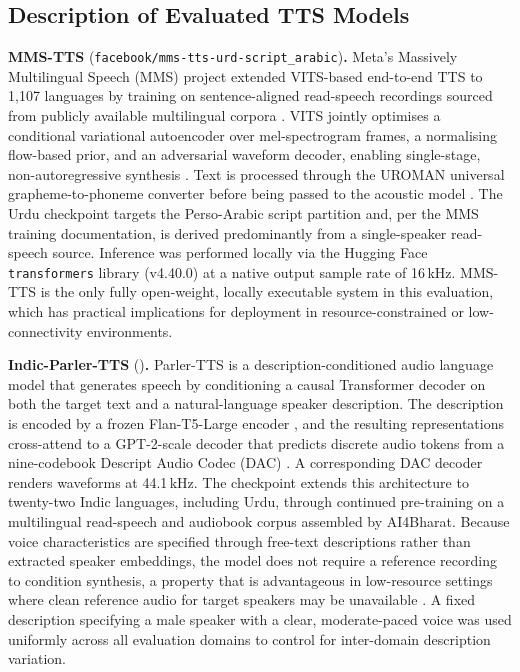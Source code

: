 \documentclass[a4paper,fleqn]{cas-dc}
\begin{document}
    \subsection{Description of Evaluated TTS Models}\label{sec:systems-desc}
    
    \begin{sloppypar}
    \indent\textbf{MMS-TTS} (\texttt{facebook/\-mms-\-tts-\-urd-\-script\_arabic})\textbf{.}
    Meta's Massively Multilingual Speech (MMS) project extended VITS-based
    end-to-end TTS \citep{kim2021vits} to 1{,}107 languages by training on
    sentence-aligned read-speech recordings sourced from publicly available
    multilingual corpora \citep{pratap2023mms}. VITS jointly optimises a
    conditional variational autoencoder over mel-spectrogram frames, a normalising
    flow-based prior, and an adversarial waveform decoder, enabling single-stage,
    non-autoregressive synthesis \citep{kim2021vits}. Text is processed through
    the UROMAN universal grapheme-to-phoneme converter before being passed to the
    acoustic model \citep{pratap2023mms}. The Urdu checkpoint targets the
    Perso-Arabic script partition and, per the MMS training documentation, is
    derived predominantly from a single-speaker read-speech source. Inference was
    performed locally via the Hugging Face \texttt{transformers} library
    (v4.40.0) at a native output sample rate of 16\,kHz. MMS-TTS is the only
    fully open-weight, locally executable system in this evaluation, which has
    practical implications for deployment in resource-constrained or
    low-connectivity environments.
    
    \indent\textbf{Indic-Parler-TTS} ()\textbf{.}
    Parler-TTS \citep{lyth2024natural,lacombe2024parlertts} is a
    description-conditioned audio language model that generates speech by
    conditioning a causal Transformer decoder on both the target text and a
    natural-language speaker description. The description is encoded by a frozen
    Flan-T5-Large encoder \citep{chung2022flan}, and the resulting representations
    cross-attend to a GPT-2-scale decoder that predicts discrete audio tokens from
    a nine-codebook Descript Audio Codec (DAC) \citep{lacombe2024parlertts}. A
    corresponding DAC decoder renders waveforms at 44.1\,kHz. The
     checkpoint \citep{ai4bharat2024indic}
    extends this architecture to twenty-two Indic languages, including Urdu,
    through continued pre-training on a multilingual read-speech and audiobook
    corpus assembled by AI4Bharat. Because voice characteristics are specified
    through free-text descriptions rather than extracted speaker embeddings,
    the model does not require a reference recording to condition synthesis, a
    property that is advantageous in low-resource settings where clean reference
    audio for target speakers may be unavailable \citep{lacombe2024parlertts}.
    A fixed description specifying a male speaker with a clear, moderate-paced
    voice was used uniformly across all evaluation domains to control for
    inter-domain description variation.
    

\end{sloppypar}
\end{document}
